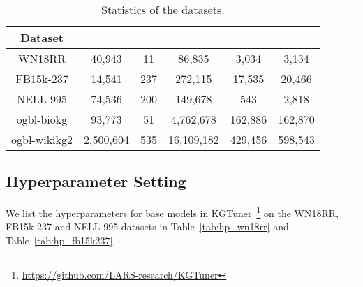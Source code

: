 \documentclass[11pt,a4paper]{article}
\begin{document}
  \begin{table}[htbp]
    \centering
    \caption{Statistics of the datasets.}
\begin{tabular}{c|ccccc}
      \toprule
      Dataset      &  &  &  &  &  \\ \midrule
      WN18RR       & 40,943         & 11             & 86,835                    & 3,034                     & 3,134                     \\
      FB15k-237    & 14,541         & 237            & 272,115                   & 17,535                    & 20,466                    \\
      NELL-995     & 74,536         & 200            & 149,678                   & 543                       & 2,818                     \\ \hline
      ogbl-biokg   & 93,773         & 51             & 4,762,678                 & 162,886                   & 162,870                   \\
      ogbl-wikikg2 & 2,500,604      & 535            & 16,109,182                & 429,456                   & 598,543                   \\
      \bottomrule
    \end{tabular}
    \label{tab:datainfo}
  \end{table}
  
  
  
  \subsection{Hyperparameter Setting}
  \label{app:hp}
  
  We list the hyperparameters for base models in KGTuner~\cite{zhang2022kgtuner}\footnote{\url{https://github.com/LARS-research/KGTuner}} on the
  WN18RR, FB15k-237 and NELL-995 datasets in Table~\ref{tab:hp_wn18rr} and Table~\ref{tab:hp_fb15k237}.
  
\end{document}
